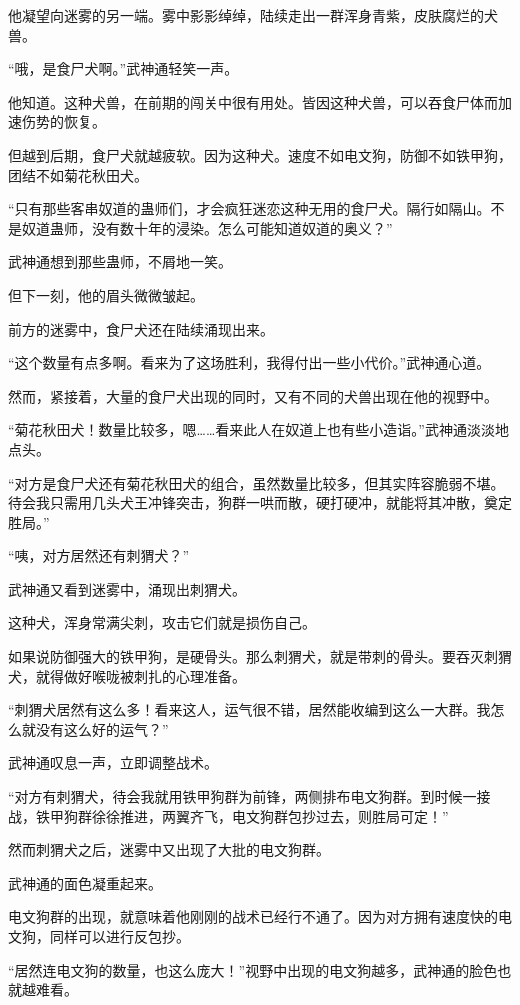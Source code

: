 \begin{this_body}
他凝望向迷雾的另一端。雾中影影绰绰，陆续走出一群浑身青紫，皮肤腐烂的犬兽。

“哦，是食尸犬啊。”武神通轻笑一声。

他知道。这种犬兽，在前期的闯关中很有用处。皆因这种犬兽，可以吞食尸体而加速伤势的恢复。

但越到后期，食尸犬就越疲软。因为这种犬。速度不如电文狗，防御不如铁甲狗，团结不如菊花秋田犬。

“只有那些客串奴道的蛊师们，才会疯狂迷恋这种无用的食尸犬。隔行如隔山。不是奴道蛊师，没有数十年的浸染。怎么可能知道奴道的奥义？”

武神通想到那些蛊师，不屑地一笑。

但下一刻，他的眉头微微皱起。

前方的迷雾中，食尸犬还在陆续涌现出来。

“这个数量有点多啊。看来为了这场胜利，我得付出一些小代价。”武神通心道。

然而，紧接着，大量的食尸犬出现的同时，又有不同的犬兽出现在他的视野中。

“菊花秋田犬！数量比较多，嗯……看来此人在奴道上也有些小造诣。”武神通淡淡地点头。

“对方是食尸犬还有菊花秋田犬的组合，虽然数量比较多，但其实阵容脆弱不堪。待会我只需用几头犬王冲锋突击，狗群一哄而散，硬打硬冲，就能将其冲散，奠定胜局。”

“咦，对方居然还有刺猬犬？”

武神通又看到迷雾中，涌现出刺猬犬。

这种犬，浑身常满尖刺，攻击它们就是损伤自己。

如果说防御强大的铁甲狗，是硬骨头。那么刺猬犬，就是带刺的骨头。要吞灭刺猬犬，就得做好喉咙被刺扎的心理准备。

“刺猬犬居然有这么多！看来这人，运气很不错，居然能收编到这么一大群。我怎么就没有这么好的运气？”

武神通叹息一声，立即调整战术。

“对方有刺猬犬，待会我就用铁甲狗群为前锋，两侧排布电文狗群。到时候一接战，铁甲狗群徐徐推进，两翼齐飞，电文狗群包抄过去，则胜局可定！”

然而刺猬犬之后，迷雾中又出现了大批的电文狗群。

武神通的面色凝重起来。

电文狗群的出现，就意味着他刚刚的战术已经行不通了。因为对方拥有速度快的电文狗，同样可以进行反包抄。

“居然连电文狗的数量，也这么庞大！”视野中出现的电文狗越多，武神通的脸色也就越难看。


\end{this_body}
